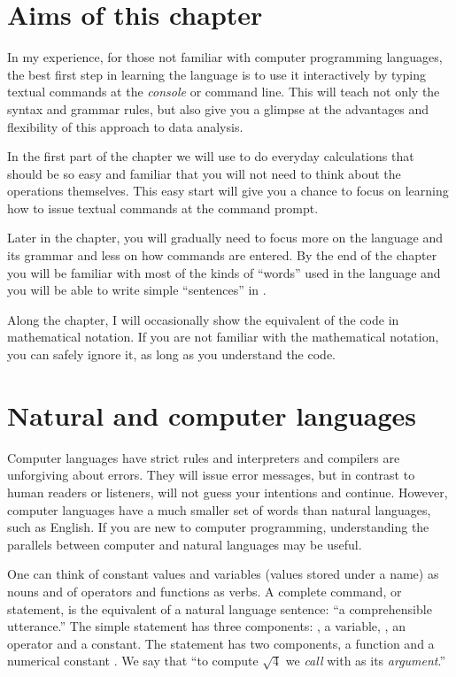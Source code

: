 \documentclass[krantz2]{krantz}\usepackage{knitr}
\begin{document}
\section{Aims of this chapter}

In my experience, for those not familiar with computer programming languages, the best first step in learning the \Rlang language is to use it interactively by typing textual commands at the \emph{console} or command line. This will teach not only the syntax and grammar rules, but also give you a glimpse at the advantages and flexibility of this approach to data analysis.

In the first part of the chapter we will use \Rlang to do everyday calculations that should be so easy and familiar that you will not need to think about the operations themselves. This easy start will give you a chance to focus on learning how to issue textual commands at the command prompt.

Later in the chapter, you will gradually need to focus more on the \Rlang language and its grammar and less on how commands are entered. By the end of the chapter you will be familiar with most of the kinds of ``words'' used in the \Rlang language and you will be able to write simple ``sentences'' in \Rlang.

Along the chapter, I will occasionally show the equivalent of the \Rlang code in mathematical notation. If you are not familiar with the mathematical notation, you can safely ignore it, as long as you understand the \Rlang code.

\section{Natural and computer languages}
Computer languages have strict rules and interpreters and compilers are unforgiving about errors. They will issue error messages, but in contrast to human readers or listeners, will not guess your intentions and continue. However, computer languages have a much smaller set of words than natural languages, such as English. If you are new to computer programming, understanding the parallels between computer and natural languages may be useful.

One can think of constant values and variables (values stored under a name) as nouns and of operators and functions as verbs. A complete command, or statement, is the equivalent of a natural language sentence: ``a comprehensible utterance.'' The simple statement  has three components: , a variable, \code{+}, an operator and  a constant. The statement  has two components, a function  and a numerical constant . We say that ``to compute $\sqrt{4}$ we \emph{call}  with  as its \emph{argument}.''
\end{document}

